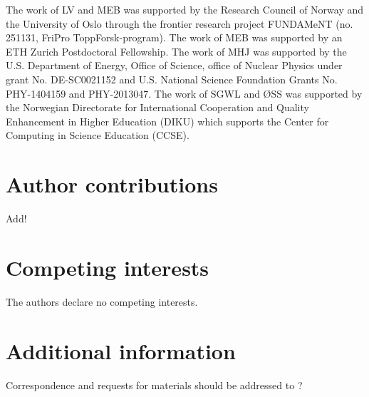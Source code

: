 \documentclass[superscriptaddress,unsortedaddress,
 amsmath,amssymb,
 aps,
]{revtex4-2}
\begin{document}


\begin{acknowledgments}

The work of LV and MEB was supported by the Research Council of Norway and the University of Oslo through the frontier research project FUNDAMeNT (no. 251131, FriPro ToppForsk-program). 
The work of MEB was supported by an ETH Zurich Postdoctoral Fellowship. 
The work of MHJ was supported by the U.S. Department of Energy, 
Office of Science, office of Nuclear Physics under grant 
No. DE-SC0021152 and U.S. National Science Foundation Grants
No. PHY-1404159 and PHY-2013047. 
The work of SGWL and ØSS was supported by the Norwegian Directorate for International Cooperation and Quality Enhancement in Higher Education (DIKU) which supports the Center for Computing in Science Education (CCSE).


\end{acknowledgments}

\section*{Author contributions}
Add! 

\section*{Competing interests}
The authors declare no competing interests.

\section*{Additional information}
Correspondence and requests for materials should be addressed to ?
\end{document}
